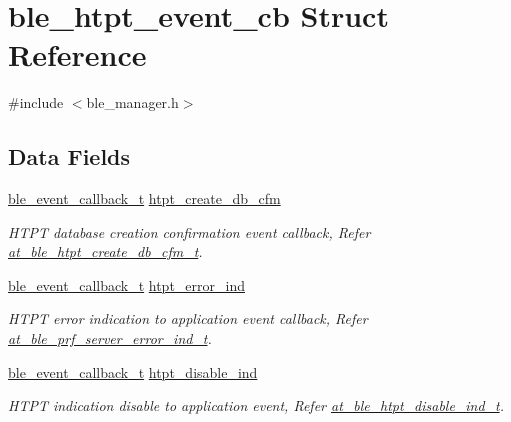 \hypertarget{structble__htpt__event__cb}{}\section{ble\+\_\+htpt\+\_\+event\+\_\+cb Struct Reference}
\label{structble__htpt__event__cb}


{\ttfamily \#include $<$ble\+\_\+manager.\+h$>$}

\subsection*{Data Fields}
\begin{DoxyCompactItemize}
\item 
\mbox{\hyperlink{ble__manager_8h_a04ce4bb8cb8282f2762e3924b1773cc9}{ble\+\_\+event\+\_\+callback\+\_\+t}} \mbox{\hyperlink{structble__htpt__event__cb_acadc78bb10239b5a8dec6e07586642ba}{htpt\+\_\+create\+\_\+db\+\_\+cfm}}
\begin{DoxyCompactList}\small\item\em H\+T\+PT database creation confirmation event callback, Refer \mbox{\hyperlink{structat__ble__htpt__create__db__cfm__t}{at\+\_\+ble\+\_\+htpt\+\_\+create\+\_\+db\+\_\+cfm\+\_\+t}}. \end{DoxyCompactList}\item 
\mbox{\hyperlink{ble__manager_8h_a04ce4bb8cb8282f2762e3924b1773cc9}{ble\+\_\+event\+\_\+callback\+\_\+t}} \mbox{\hyperlink{structble__htpt__event__cb_abb98bb72becfe308ad6aa77782a09081}{htpt\+\_\+error\+\_\+ind}}
\begin{DoxyCompactList}\small\item\em H\+T\+PT error indication to application event callback, Refer \mbox{\hyperlink{structat__ble__prf__server__error__ind__t}{at\+\_\+ble\+\_\+prf\+\_\+server\+\_\+error\+\_\+ind\+\_\+t}}. \end{DoxyCompactList}\item 
\mbox{\hyperlink{ble__manager_8h_a04ce4bb8cb8282f2762e3924b1773cc9}{ble\+\_\+event\+\_\+callback\+\_\+t}} \mbox{\hyperlink{structble__htpt__event__cb_a4007b804236368cbbad962c31bdd50cd}{htpt\+\_\+disable\+\_\+ind}}
\begin{DoxyCompactList}\small\item\em H\+T\+PT indication disable to application event, Refer \mbox{\hyperlink{structat__ble__htpt__disable__ind__t}{at\+\_\+ble\+\_\+htpt\+\_\+disable\+\_\+ind\+\_\+t}}. \end{DoxyCompactList}\item 

\end{DoxyCompactItemize}
